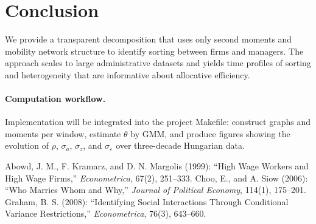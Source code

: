 \documentclass[11pt]{article}
\begin{document}
\section{Conclusion}
We provide a transparent decomposition that uses only second moments and mobility network structure to identify sorting between firms and managers. The approach scales to large administrative datasets and yields time profiles of sorting and heterogeneity that are informative about allocative efficiency.

\paragraph{Computation workflow.} Implementation will be integrated into the project Makefile: construct graphs and moments per window, estimate $\theta$ by GMM, and produce figures showing the evolution of $\rho$, $\sigma_a$, $\sigma_z$, and $\sigma_\varepsilon$ over three-decade Hungarian data.


\begin{thebibliography}{9}
 Abowd, J. M., F. Kramarz, and D. N. Margolis (1999): ``High Wage Workers and High Wage Firms,'' \emph{Econometrica}, 67(2), 251--333.
 Choo, E., and A. Siow (2006): ``Who Marries Whom and Why,'' \emph{Journal of Political Economy}, 114(1), 175--201.
 Graham, B. S. (2008): ``Identifying Social Interactions Through Conditional Variance Restrictions,'' \emph{Econometrica}, 76(3), 643--660.
\end{thebibliography}
\end{document}
